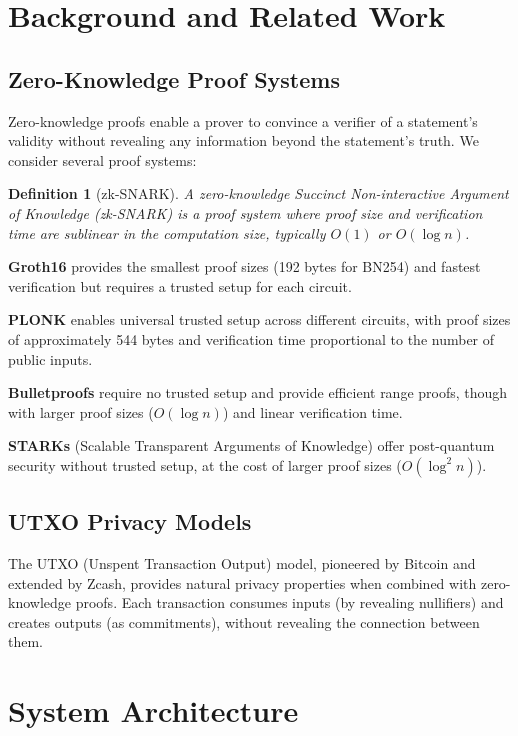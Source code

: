 \documentclass[11pt,a4paper]{article}
\newtheorem{definition}{Definition}
\begin{document}
\section{Background and Related Work}

\subsection{Zero-Knowledge Proof Systems}

Zero-knowledge proofs enable a prover to convince a verifier of a statement's validity without revealing any information beyond the statement's truth. We consider several proof systems:

\begin{definition}[zk-SNARK]
A zero-knowledge Succinct Non-interactive Argument of Knowledge (zk-SNARK) is a proof system where proof size and verification time are sublinear in the computation size, typically $O(1)$ or $O(\log n)$.
\end{definition}

\textbf{Groth16} provides the smallest proof sizes (192 bytes for BN254) and fastest verification but requires a trusted setup for each circuit.

\textbf{PLONK} enables universal trusted setup across different circuits, with proof sizes of approximately 544 bytes and verification time proportional to the number of public inputs.

\textbf{Bulletproofs} require no trusted setup and provide efficient range proofs, though with larger proof sizes ($O(\log n)$) and linear verification time.

\textbf{STARKs} (Scalable Transparent Arguments of Knowledge) offer post-quantum security without trusted setup, at the cost of larger proof sizes ($O(\log^2 n)$).

\subsection{UTXO Privacy Models}

The UTXO (Unspent Transaction Output) model, pioneered by Bitcoin and extended by Zcash, provides natural privacy properties when combined with zero-knowledge proofs. Each transaction consumes inputs (by revealing nullifiers) and creates outputs (as commitments), without revealing the connection between them.

\section{System Architecture}
\end{document}
